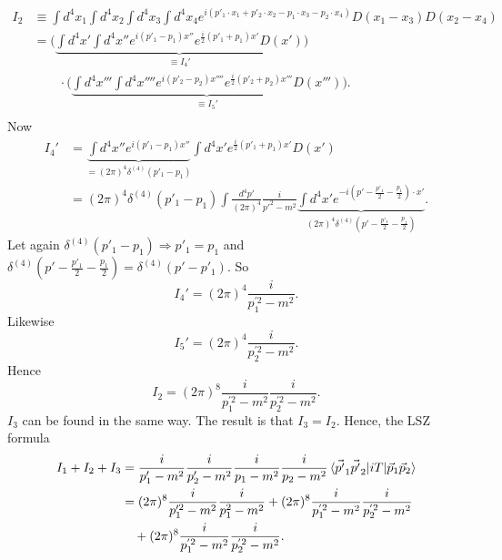 \begin{example}
\begin{enumerate}
\begin{equation}
			\begin{split}
				I_2&\equiv \int d^4x_1\int d^4x_2\int d^4x_3\int d^4x_4 e^{i(p'_1\cdot x_1+p'_2\cdot x_2-p_1\cdot x_3-p_2\cdot x_4)}D(x_1-x_3)D(x_2-x_4)\\
				&=\bigg(\underbrace{\int d^4x' \int d^4x''e^{i(p'_1-p_1)x''}e^{\frac{i}{2}(p'_1+p_1)x'}D(x')}_{\equiv I_4'}\bigg)\\
				&\qquad\cdot\bigg(\underbrace{\int d^4x''' \int d^4x''''e^{i(p'_2-p_2)x''''}e^{\frac{i}{2}(p'_2+p_2)x'''}D(x''')}_{\equiv I_5'}\bigg).\\
			\end{split}
		\end{equation} 
		Now
		\begin{equation}
			\begin{split}
				I_4'&=\underbrace{\int d^4x''e^{i(p'_1-p_1)x''}}_{=(2\pi)^4\delta^{(4)}(p'_1-p_1)}\int d^4x'e^{\frac{i}{2}(p'_1+p_1)x'}D(x')\\
				&=(2\pi)^4\delta^{(4)}(p'_1-p_1)\int\frac{d^4p'}{(2\pi)^4}\frac{i}{p'^2-m^2}\underbrace{\int d^4x'e^{-i(p'-\frac{p'_1}{2}-\frac{p_1}{2})\cdot x'}}_{(2\pi)^4\delta^{(4)}(p'-\frac{p'_1}{2}-\frac{p_1}{2})}.
			\end{split}
		\end{equation} 
		Let again $\delta^{(4)}(p'_1-p_1)\Rightarrow p'_1=p_1$ and $\delta^{(4)}(p'-\frac{p'_1}{2}-\frac{p_1}{2})=\delta^{(4)}(p'-p'_1)$. So
		\begin{equation}
			I_4'=(2\pi)^4\frac{i}{p_1^{'2}-m^2}.
		\end{equation} 
		Likewise
		\begin{equation}
			I_5'=(2\pi)^4\frac{i}{p_2^{'2}-m^2}.
		\end{equation} 
		Hence
		\begin{equation}
			I_2=(2\pi)^8\frac{i}{p_1^{'2}-m^2}\frac{i}{p_2^{'2}-m^2}.
		\end{equation} 
		$I_3$ can be found in the same way. The result is that $I_3=I_2$. Hence, the LSZ formula
		\begin{equation}
			\begin{split}
				I_1+I_2+I_3&=\frac{i}{p'_1-m^2}\frac{i}{p'_2-m^2}\frac{i}{p_1-m^2}\frac{i}{p_2-m^2}\braket{\vec{p'}_1\vec{p'}_2|iT|\vec{p}_1\vec{p}_2}\\
				&=(2\pi)^8\frac{i}{p_1'^2-m^2}\frac{i}{p_1^2-m^2}+(2\pi)^8\frac{i}{p_1^{'2}-m^2}\frac{i}{p_2^{'2}-m^2}\\
				&\quad+(2\pi)^8\frac{i}{p_1^{'2}-m^2}\frac{i}{p_2^{'2}-m^2}.\\
			\end{split}

\end{equation}
\end{enumerate}
\end{example}
